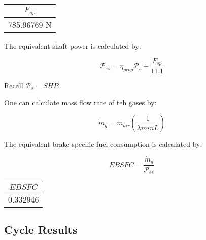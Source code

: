 \documentclass[titlepage]{article}
\begin{document}
    \begin{center}
        \begin{tabular}{|c|}
            \hline
            $F_{sp}$ \\
            \hline
            785.96769 N \\
            \hline
        \end{tabular}
    \end{center}


    The equivalent shaft power is calculated by:

    \begin{equation}
        \mathcal{P}_{es} = \eta_{prop} \mathcal{P}_{s} + \frac{F_{sp}}{11.1}
    \end{equation}

    Recall $\mathcal{P}_{s} = SHP$.

    \vspace*{0.5cm}
    
    One can calculate mass flow rate of teh gases by:

    \begin{equation}
        \dot{m}_{g} = \dot{m}_{air} \left(\frac{1}{\lambda minL}\right) 
    \end{equation}

    The equivalent brake specific fuel consumption is calculated by:

    \begin{equation}
        EBSFC = \frac{\dot{m}_{g}}{\mathcal{P}_{es}}
    \end{equation}

    \begin{center}
        \begin{tabular}{|c|}
            \hline
            $EBSFC$ \\
            \hline
            0.332946 \\
            \hline
        \end{tabular}
    \end{center}

    \subsection{Cycle Results}
\end{document}
